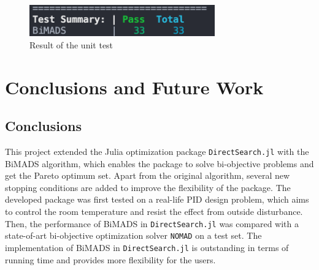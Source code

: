 \documentclass[11pt,oneside,onecolumn,openright]{article}
\begin{document}
    \begin{figure}[t]
    \centering
    \includegraphics[width=8cm]{fig/unit_test.png}
    \caption{Result of the unit test}
    \label{fig:unit_test}
    \end{figure}

\section{Conclusions and Future Work}
\subsection{Conclusions}
  This project extended the Julia optimization package \verb|DirectSearch.jl| with the BiMADS algorithm, which enables the package to solve bi-objective problems and get the Pareto optimum set. Apart from the original algorithm, several new stopping conditions are added to improve the flexibility of the package. The developed package was first tested on a real-life PID design problem, which aims to control the room temperature and resist the effect from outside disturbance. Then, the performance of BiMADS in \verb|DirectSearch.jl| was compared with a state-of-art bi-objective optimization solver \verb|NOMAD| on a test set. The implementation of BiMADS in \verb|DirectSearch.jl| is outstanding in terms of running time and provides more flexibility for the users.
\end{document}
